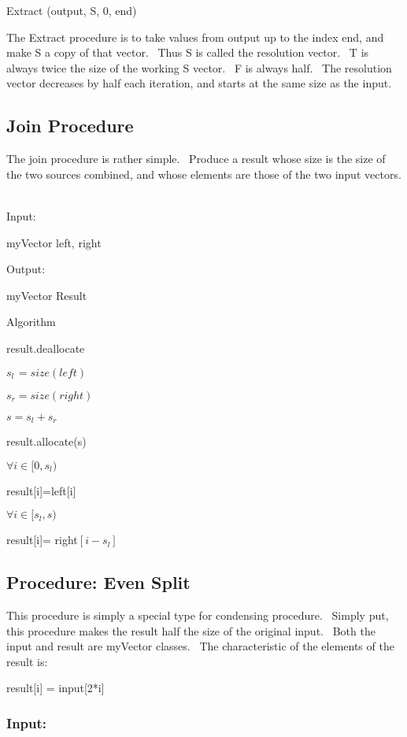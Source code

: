 \documentclass{article}
\begin{document}
\qquad Extract (output, S, 0, end)

\bigskip

The Extract procedure is to take values from output up to the index end, and
make S a copy of that vector. \ Thus S is called the resolution vector. \ T
is always twice the size of the working S vector. \ F is always half. \ The
resolution vector decreases by half each iteration, and starts at the same
size as the input.

\bigskip

\subsection{Join Procedure}

The join procedure is rather simple. \ Produce a result whose size is the
size of the two sources combined, and whose elements are those of the two
input vectors. \ 

Input:

\qquad myVector left, right

Output:

\qquad myVector Result

Algorithm

\qquad result.deallocate

\qquad $s_{l\,}=size(left)$

\qquad $s_{r}=size(right)$

\qquad $s=s_{l}+s_{r}$

\qquad result.allocate(s)

\qquad $\forall i\in \lbrack 0,s_{l})$

\qquad \qquad result[i]=left[i]

\qquad $\forall i\in \lbrack s_{l},s)$

\qquad \qquad result[i]= right$[i-s_{l}]$

\subsection{Procedure: Even Split}

This procedure is simply a special type for condensing procedure. \ Simply
put, this procedure makes the result half the size of the original input. \
Both the input and result are myVector classes. \ The characteristic of the
elements of the result is:

\qquad result[i] = input[2*i]

\subsubsection{Input:}
\end{document}
